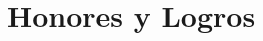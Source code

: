 \documentclass[letterpaper, 11pt]{article}
\renewenvironment{itemize}{
  \begin{list}{}{
    \setlength{\leftmargin}{0.45cm}
  }
}{
  \end{list}
}
\begin{document}
%

\section*{Honores y Logros}
\end{document}
